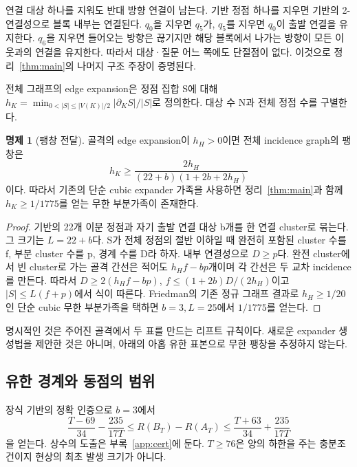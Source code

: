 \documentclass[11pt,a4paper]{article}
\theoremstyle{definition}
\newtheorem{proposition}[theorem]{명제}
\theoremstyle{remark}\newtheorem{remark}[theorem]{주석}
\newcommand{\Reg}{R}
\begin{document}
연결 대상 하나를 지워도 반대 방향 연결이 남는다. 기반 정점 하나를 지우면 기반의 2-연결성으로 블록 내부는 연결된다. $q_0$을 지우면 $q_5$가, $q_5$를 지우면 $q_0$이 출발 연결을 유지한다. $q_6$을 지우면 들어오는 방향은 끊기지만 해당 블록에서 나가는 방향이 모든 이웃과의 연결을 유지한다. 따라서 대상·질문 어느 쪽에도 단절점이 없다. 이것으로 정리~\ref{thm:main}의 나머지 구조 주장이 증명된다.

전체 그래프의 edge expansion은 정점 집합 S에 대해
$h_K=\min_{0<|S|\le |V(K)|/2}|\partial_K S|/|S|$로 정의한다. 대상 수 N과 전체 정점 수를 구별한다.
\begin{proposition}[팽창 전달]\label{prop:expansion}
골격의 edge expansion이 $h_H>0$이면 전체 incidence graph의 팽창은
\begin{equation}\label{eq:expansion}
 h_K\ge\frac{2h_H}{(22+b)(1+2b+2h_H)}
\end{equation}
이다. 따라서 기존의 단순 cubic expander 가족을 사용하면 정리~\ref{thm:main}과 함께 $h_K\ge1/1775$를 얻는 무한 부분가족이 존재한다.
\end{proposition}
\begin{proof}
기반의 22개 이분 정점과 자기 출발 연결 대상 b개를 한 연결 cluster로 묶는다. 그 크기는 $L=22+b$다. S가 전체 정점의 절반 이하일 때 완전히 포함된 cluster 수를 f, 부분 cluster 수를 p, 경계 수를 D라 하자. 내부 연결성으로 $D\ge p$다. 완전 cluster에서 빈 cluster로 가는 골격 간선은 적어도 $h_Hf-bp$개이며 각 간선은 두 교차 incidence를 만든다. 따라서 $D\ge2(h_Hf-bp)$, $f\le(1+2b)D/(2h_H)$이고 $|S|\le L(f+p)$에서 식이 따른다. Friedman\cite{friedman}의 기존 정규 그래프 결과로 $h_H\ge1/20$인 단순 cubic 무한 부분가족을 택하면 $b=3,L=25$에서 $1/1775$를 얻는다.
\end{proof}
명시적인 것은 주어진 골격에서 두 표를 만드는 리프트 규칙이다. 새로운 expander 생성법을 제안한 것은 아니며, 아래의 아홉 유한 표본으로 무한 팽창을 추정하지 않는다.

\subsection{유한 경계와 동점의 범위}\label{sec:finitebound}
장식 기반의 정확 인증으로 $b=3$에서
\begin{equation}\label{eq:finitebound}
 \frac{T-69}{34}-\frac{235}{17T}\le \Reg(B_T)-\Reg(A_T)
 \le\frac{T+63}{34}+\frac{235}{17T}
\end{equation}
을 얻는다. 상수의 도출은 부록~\ref{app:cert}에 둔다. $T\ge76$은 양의 하한을 주는 충분조건이지 현상의 최초 발생 크기가 아니다.
\end{document}
